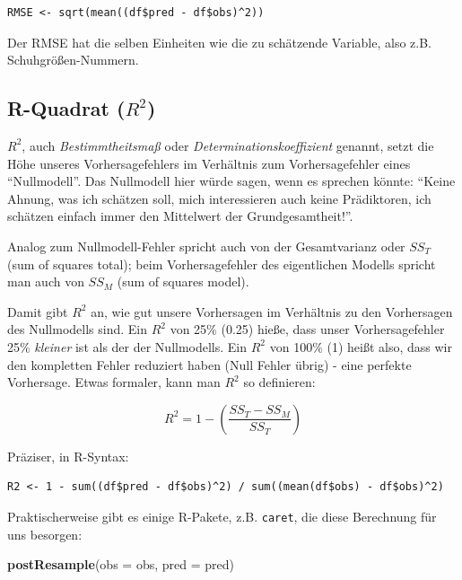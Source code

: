 \documentclass[12pt,ngerman,]{book}
\makeatletter
\newenvironment{Shaded}{\begin{snugshade}}{\end{snugshade}}
\newcommand{\KeywordTok}[1]{\textcolor[rgb]{0.13,0.29,0.53}{\textbf{{#1}}}}
\newcommand{\DataTypeTok}[1]{\textcolor[rgb]{0.13,0.29,0.53}{{#1}}}
\newcommand{\NormalTok}[1]{{#1}}
\newenvironment{kframe}{%
\medskip{}
\setlength{\fboxsep}{.8em}
 \def\at@end@of@kframe{}%
 \ifinner\ifhmode%
  \def\at@end@of@kframe{\end{minipage}}%
  \begin{minipage}{\columnwidth}%
 \fi\fi%
 \def\FrameCommand##1{\hskip\@totalleftmargin \hskip-\fboxsep
 \colorbox{shadecolor}{##1}\hskip-\fboxsep
     \hskip-\linewidth \hskip-\@totalleftmargin \hskip\columnwidth}%
 \MakeFramed {\advance\hsize-\width
   \@totalleftmargin\z@ \linewidth\hsize
   \@setminipage}}%
 {\par\unskip\endMakeFramed%
 \at@end@of@kframe}
\renewenvironment{Shaded}{\begin{kframe}}{\end{kframe}}
\theoremstyle{definition}
\theoremstyle{definition}
\theoremstyle{remark}
\makeatother
\begin{document}
\begin{verbatim}
RMSE <- sqrt(mean((df$pred - df$obs)^2))
\end{verbatim}

Der RMSE hat die selben Einheiten wie die zu schätzende Variable, also
z.B. Schuhgrößen-Nummern.

\subsection{\texorpdfstring{R-Quadrat
(\(R^2\))}{R-Quadrat (R\^{}2)}}\label{r-quadrat-r2}

\(R^2\), auch \emph{Bestimmtheitsmaß} oder
\emph{Determinationskoeffizient}
genannt, setzt die Höhe unseres
Vorhersagefehlers im Verhältnis zum
Vorhersagefehler eines ``Nullmodell''. Das Nullmodell hier würde sagen,
wenn es sprechen könnte: ``Keine Ahnung, was ich schätzen soll, mich
interessieren auch keine Prädiktoren, ich schätzen einfach immer den
Mittelwert der Grundgesamtheit!''.

Analog zum Nullmodell-Fehler spricht auch von der Gesamtvarianz oder
\(SS_T\) (sum of squares total); beim Vorhersagefehler des eigentlichen
Modells spricht man auch von \(SS_M\) (sum of squares model).

Damit gibt \(R^2\) an, wie gut unsere Vorhersagen im Verhältnis zu den
Vorhersagen des Nullmodells sind. Ein \(R^2\) von 25\% (0.25) hieße,
dass unser Vorhersagefehler 25\% \emph{kleiner} ist als der der
Nullmodells. Ein \(R^2\) von 100\% (1) heißt also, dass wir den
kompletten Fehler reduziert haben (Null Fehler übrig) - eine perfekte
Vorhersage. Etwas formaler, kann man \(R^2\) so definieren:

\[ R^2 = 1 - \left( \frac{SS_T - SS_M}{SS_T} \right)\]

Präziser, in R-Syntax:

\begin{verbatim}
R2 <- 1 - sum((df$pred - df$obs)^2) / sum((mean(df$obs) - df$obs)^2)
\end{verbatim}

Praktischerweise gibt es einige R-Pakete, z.B. \texttt{caret}, die diese
Berechnung für uns besorgen:

\begin{Shaded}
\begin{Highlighting}[]
\KeywordTok{postResample}\NormalTok{(}\DataTypeTok{obs =} \NormalTok{obs, }\DataTypeTok{pred =} \NormalTok{pred)}
\end{Highlighting}
\end{Shaded}
\end{document}
